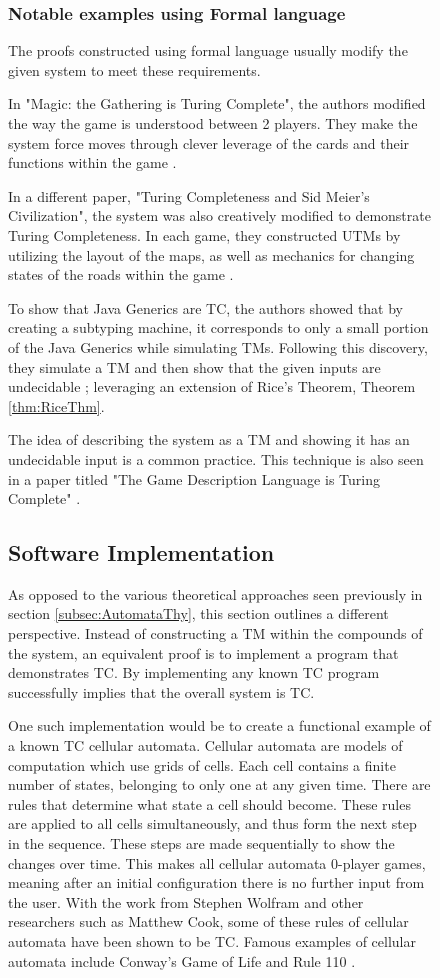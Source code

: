 \begin{figure}[htb]
\subsubsection{Notable examples using Formal language}

The proofs constructed using formal language usually modify the given system to meet these requirements.

In "Magic: the Gathering is Turing Complete", the authors modified the way the game is understood between 2 players.
They make the system force moves through clever leverage of the cards and their functions within the game \cite{MtGTC}.

In a different paper, "Turing Completeness and Sid Meier's Civilization", the system was also creatively modified to demonstrate Turing Completeness.
In each game, they constructed UTMs by utilizing the layout of the maps, as well as mechanics for changing states of the roads within the game \cite{CivTC}.

To show that Java Generics are TC, the authors showed that by creating a subtyping machine, it corresponds to only a small portion of the Java Generics while simulating TMs.
Following this discovery, they simulate a TM and then show that the given inputs are undecidable \cite{JavaGenericsTC}; leveraging an extension of Rice's Theorem, Theorem \ref{thm:RiceThm}.

The idea of describing the system as a TM and showing it has an undecidable input is a common practice.
This technique is also seen in a paper titled "The Game Description Language is Turing Complete" \cite{GDLTC}.

\subsection{Software Implementation}\label{subsec:SoftwareImplementation}

As opposed to the various theoretical approaches seen previously in section \ref{subsec:AutomataThy}, this section outlines a different perspective.
Instead of constructing a TM within the compounds of the system, an equivalent proof is to implement a program that demonstrates TC.
By implementing any known TC program successfully implies that the overall system is TC.

One such implementation would be to create a functional example of a known TC cellular automata.
Cellular automata are models of computation which use grids of cells.
Each cell contains a finite number of states, belonging to only one at any given time.
There are rules that determine what state a cell should become.
These rules are applied to all cells simultaneously, and thus form the next step in the sequence.
These steps are made sequentially to show the changes over time.
This makes all cellular automata 0-player games, meaning after an initial configuration there is no further input from the user.
With the work from Stephen Wolfram and other researchers such as Matthew Cook, some of these rules of cellular automata have been shown to be TC.
Famous examples of cellular automata include Conway's Game of Life and Rule 110 \cite{CellAutWiki,CellAutWolfram}.


\end{figure}
